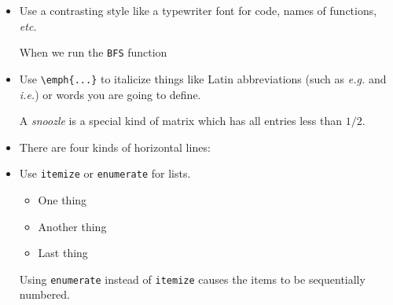 \documentclass{article}
\begin{document}
\begin{itemize}
\item Use a contrasting style like a typewriter font for code, names
  of functions, \emph{etc.}
  \begin{good}When we run the \texttt{BFS} function\end{good}
\item Use \verb|\emph{...}| to italicize things like Latin abbreviations
  (such as \emph{e.g.} and \emph{i.e.}) or words you are going to
  define.
\begin{good}
A \emph{snoozle} is a special kind of matrix which has all entries less than $1/2$.
\end{good}
\item There are four kinds of horizontal lines:
\item Use \verb|itemize| or \verb|enumerate| for lists.
\begin{good}
\begin{itemize}
  \item One thing
  \item Another thing
  \item Last thing
\end{itemize}
\end{good}
  Using \verb|enumerate| instead of \verb|itemize| causes the items to
  be sequentially numbered.


\end{itemize}
\end{document}
